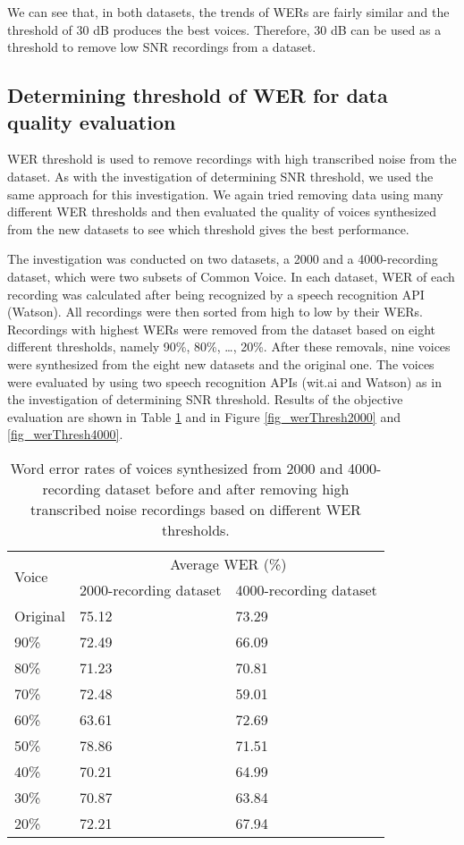 \documentclass[12pt]{article}
\begin{document}
We can see that, in both datasets, the trends of WERs are fairly similar and the threshold of 30 dB produces the best voices. Therefore, 30 dB can be used as a threshold to remove low SNR recordings from a dataset.

\subsection{Determining threshold of WER for data quality evaluation}
WER threshold is used to remove recordings with high transcribed noise from the dataset. As with the investigation of determining SNR threshold, we used the same approach for this investigation. We again tried removing data using many different WER thresholds and then evaluated the quality of voices synthesized from the new datasets to see which threshold gives the best performance.

The investigation was conducted on two datasets, a 2000 and a 4000-recording dataset, which were two subsets of Common Voice. In each dataset, WER of each recording was calculated after being recognized by a speech recognition API (Watson). All recordings were then sorted from high to low by their WERs. Recordings with highest WERs were removed from the dataset based on eight different thresholds, namely 90\%, 80\%, …, 20\%. After these removals, nine voices were synthesized from the eight new datasets and the original one. The voices were evaluated by using two speech recognition APIs (wit.ai and Watson) as in the investigation of determining SNR threshold. Results of the objective evaluation are shown in Table \ref{tab_werWerThresh} and in Figure \ref{fig_werThresh2000} and \ref{fig_werThresh4000}.

\begin{table}[]
\begin{center}
\caption{Word error rates of voices synthesized from 2000 and 4000-recording dataset before and after removing high transcribed noise recordings based on different WER thresholds.}
\label{tab_werWerThresh}
\vspace{3mm}
\begin{tabular}{|l|l|l|}
\hline
\multirow{2}{1.7cm}{Voice} &
\multicolumn{2}{c|}{Average WER (\%)} \\ \cline{2-3}
& 2000-recording dataset & 4000-recording dataset \\
\hline
Original & 75.12 & 73.29\\
90\%     & 72.49 & 66.09\\
80\%     & 71.23 & 70.81\\
70\%     & 72.48 & 59.01\\
60\%     & 63.61 & 72.69\\
50\%     & 78.86 & 71.51\\
40\%     & 70.21 & 64.99\\
30\%     & 70.87 & 63.84\\
20\%     & 72.21 & 67.94\\
\hline
\end{tabular}
\end{center}
\end{table}
\end{document}
